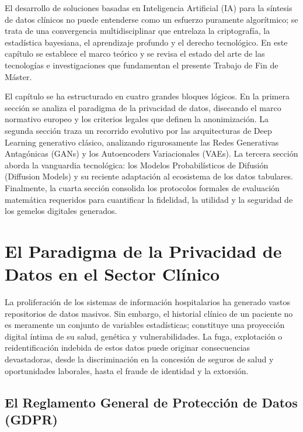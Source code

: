 
El desarrollo de soluciones basadas en Inteligencia Artificial (IA) para la síntesis de datos clínicos no puede entenderse como un esfuerzo puramente algorítmico; se trata de una convergencia multidisciplinar que entrelaza la criptografía, la estadística bayesiana, el aprendizaje profundo y el derecho tecnológico. En este capítulo se establece el marco teórico y se revisa el estado del arte de las tecnologías e investigaciones que fundamentan el presente Trabajo de Fin de Máster.

El capítulo se ha estructurado en cuatro grandes bloques lógicos. En la primera sección se analiza el paradigma de la privacidad de datos, disecando el marco normativo europeo y los criterios legales que definen la anonimización. La segunda sección traza un recorrido evolutivo por las arquitecturas de Deep Learning generativo clásico, analizando rigurosamente las Redes Generativas Antagónicas (GANs) y los Autoencoders Variacionales (VAEs). La tercera sección aborda la vanguardia tecnológica: los Modelos Probabilísticos de Difusión (Diffusion Models) y su reciente adaptación al ecosistema de los datos tabulares. Finalmente, la cuarta sección consolida los protocolos formales de evaluación matemática requeridos para cuantificar la fidelidad, la utilidad y la seguridad de los gemelos digitales generados.

\setcounter{section}{0}
\section{El Paradigma de la Privacidad de Datos en el Sector Clínico}

La proliferación de los sistemas de información hospitalarios ha generado vastos repositorios de datos masivos. Sin embargo, el historial clínico de un paciente no es meramente un conjunto de variables estadísticas; constituye una proyección digital íntima de su salud, genética y vulnerabilidades. La fuga, explotación o reidentificación indebida de estos datos puede originar consecuencias devastadoras, desde la discriminación en la concesión de seguros de salud y oportunidades laborales, hasta el fraude de identidad y la extorsión.

\subsection{El Reglamento General de Protección de Datos (GDPR)}

